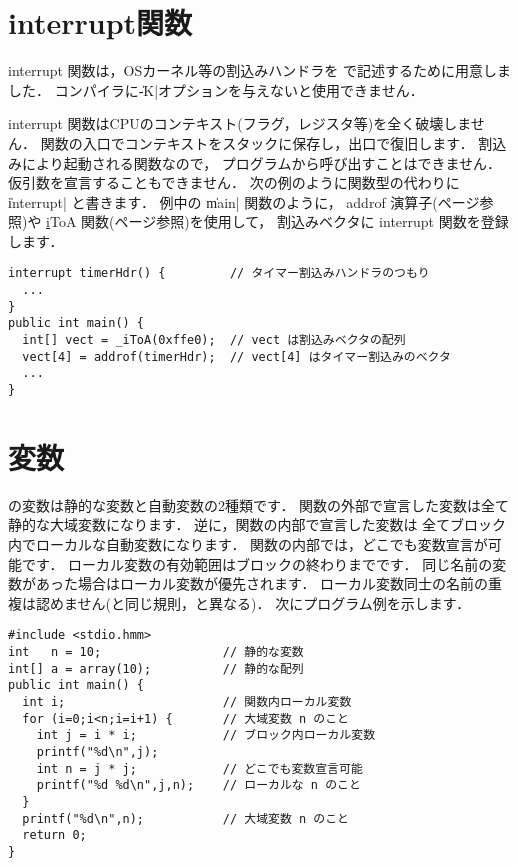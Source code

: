 \section{interrupt関数}
interrupt 関数は，OSカーネル等の割込みハンドラを\cmml
で記述するために用意しました．
コンパイラに\|-K|オプションを与えないと使用できません．

interrupt 関数はCPUのコンテキスト(フラグ，レジスタ等)を全く破壊しません．
関数の入口でコンテキストをスタックに保存し，出口で復旧します．
割込みにより起動される関数なので，
プログラムから呼び出すことはできません．
仮引数を宣言することもできません．
次の例のように関数型の代わりに \|interrupt| と書きます．
例中の \|main| 関数のように，
addrof 演算子(\pageref{chap3:addrof}ページ参照)や
\ul iToA 関数(\pageref{chap4:itoa}ページ参照)を使用して，
割込みベクタに interrupt 関数を登録します．

\begin{mylist}
\begin{verbatim}
interrupt timerHdr() {         // タイマー割込みハンドラのつもり
  ...
}
public int main() {
  int[] vect = _iToA(0xffe0);  // vect は割込みベクタの配列
  vect[4] = addrof(timerHdr);  // vect[4] はタイマー割込みのベクタ
  ...
}
\end{verbatim}
\end{mylist}

\section{変数}

\cmml の変数は静的な変数と自動変数の2種類です．
関数の外部で宣言した変数は全て静的な大域変数になります．
逆に，関数の内部で宣言した変数は
全てブロック内でローカルな自動変数になります．
関数の内部では，どこでも変数宣言が可能です．
ローカル変数の有効範囲はブロックの終わりまでです．
同じ名前の変数があった場合はローカル変数が優先されます．
ローカル変数同士の名前の重複は認めません(\javal と同じ規則，\cl と異なる)．
次にプログラム例を示します．

\begin{mylist}
\begin{verbatim}
#include <stdio.hmm>
int   n = 10;                 // 静的な変数
int[] a = array(10);          // 静的な配列
public int main() {
  int i;                      // 関数内ローカル変数
  for (i=0;i<n;i=i+1) {       // 大域変数 n のこと
    int j = i * i;            // ブロック内ローカル変数
    printf("%d\n",j);
    int n = j * j;            // どこでも変数宣言可能
    printf("%d %d\n",j,n);    // ローカルな n のこと
  }                        
  printf("%d\n",n);           // 大域変数 n のこと
  return 0;
}
\end{verbatim}
\end{mylist}

